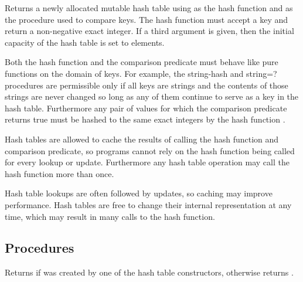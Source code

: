 \documentclass[twoside]{algol60}
\begin{document}
\begin{entry}{%
}

Returns a newly allocated mutable hash table using  
as the hash function and  as the procedure used to 
compare keys.  The hash function must accept a key and return a 
non-negative exact integer. If a third argument is given, then the 
initial capacity of the hash table is set to  elements.

Both the hash function  and the comparison
predicate  must behave like pure functions
on the domain of keys.  For example, the {\cf string-hash}
and {\cf string=?} procedures are permissible only if all
keys are strings and the contents of those strings are never
changed so long as any of them continue to serve as a key in
the hash table.  Furthermore any pair of values for which
the comparison predicate  returns true must
be hashed to the same exact integers by the hash function
.

\begin{note}
Hash tables are allowed to cache the results of calling the
hash function and comparison predicate, so programs cannot
rely on the hash function being called for every lookup or
update.  Furthermore any hash table operation may call the
hash function more than once.
\end{note}

\begin{rationale}
Hash table lookups are often followed by updates, so caching
may improve performance.  Hash tables are free to change
their internal representation at any time, which may result
in many calls to the hash function.
\end{rationale}

\end{entry}

\subsection{Procedures}

\begin{entry}{%
}
Returns \schtrue{} if  was created by one of the hash table constructors, otherwise returns \schfalse.
\end{entry}
\end{document}
